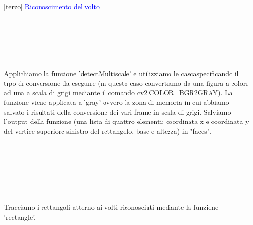 \documentclass[12pt]{article}
\begin{document}
{  	
  
\ref {terzo} \underline{\textcolor{blue}{Riconoscimento del volto}}
    \\
    \\
    \\
  
  	\\
  	\\
  	\\
  	\\
  	Applichiamo la funzione 'detectMultiscale' e utilizziamo le cascaspecificando il tipo di conversione da eseguire (in questo caso convertiamo da una figura a colori ad una a scala di grigi mediante il comando cv2.COLOR\_BGR2GRAY). La funzione viene applicata a 'gray' ovvero la zona di memoria in cui abbiamo salvato i risultati della conversione dei vari frame in scala di grigi. Salviamo l'output della funzione (una lista di quattro elementi: coordinata x e coordinata y del vertice superiore sinistro del rettangolo, base e altezza) in "faces".
  	\\
  	\\
  	\\
  	\\
  	\\
  	\\
  	\\
  	\\
  	Tracciamo i rettangoli attorno ai volti riconosciuti mediante la funzione 'rectangle'.
\pagebreak
  	
}
\end{document}

